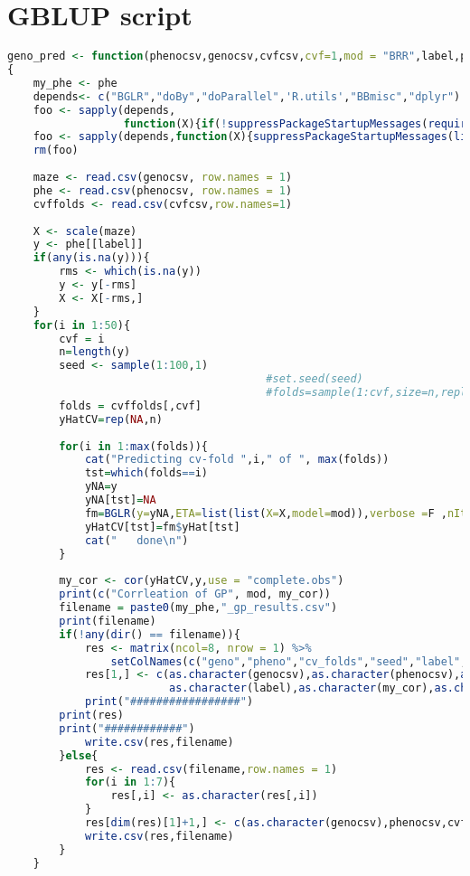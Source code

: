 \section{GBLUP script}
\begin{lstlisting}[language=R]
    geno_pred <- function(phenocsv,genocsv,cvfcsv,cvf=1,mod = "BRR",label,phe)
{
    my_phe <- phe
    depends<- c("BGLR","doBy","doParallel",'R.utils',"BBmisc","dplyr")
    foo <- sapply(depends,
                  function(X){if(!suppressPackageStartupMessages(require(X,character.only = T))){install.packages(X)}})
    foo <- sapply(depends,function(X){suppressPackageStartupMessages(library(X,character.only=TRUE))})
    rm(foo) 
     
    maze <- read.csv(genocsv, row.names = 1)
    phe <- read.csv(phenocsv, row.names = 1)
    cvffolds <- read.csv(cvfcsv,row.names=1)
    
    X <- scale(maze)
    y <- phe[[label]]
    if(any(is.na(y))){
        rms <- which(is.na(y))
        y <- y[-rms]
        X <- X[-rms,]
    }
    for(i in 1:50){
        cvf = i
        n=length(y)
        seed <- sample(1:100,1)
                                        #set.seed(seed)
                                        #folds=sample(1:cvf,size=n,replace=T)
        folds = cvffolds[,cvf]
        yHatCV=rep(NA,n)
        
        for(i in 1:max(folds)){
            cat("Predicting cv-fold ",i," of ", max(folds))
            tst=which(folds==i)
            yNA=y
            yNA[tst]=NA
            fm=BGLR(y=yNA,ETA=list(list(X=X,model=mod)),verbose =F ,nIter=7000,burnIn=1000)
            yHatCV[tst]=fm$yHat[tst]
            cat("   done\n")
        }
        
        my_cor <- cor(yHatCV,y,use = "complete.obs")
        print(c("Corrleation of GP", mod, my_cor))
        filename = paste0(my_phe,"_gp_results.csv")
        print(filename)
        if(!any(dir() == filename)){
            res <- matrix(ncol=8, nrow = 1) %>%
                setColNames(c("geno","pheno","cv_folds","seed","label", "cor","method","nmark"))
            res[1,] <- c(as.character(genocsv),as.character(phenocsv),as.character(cvf),as.character(seed),
                         as.character(label),as.character(my_cor),as.character(mod),dim(X)[2])
            print("#################")
	    print(res)
	    print("############")
            write.csv(res,filename)
        }else{
            res <- read.csv(filename,row.names = 1)
            for(i in 1:7){
                res[,i] <- as.character(res[,i])
            }
            res[dim(res)[1]+1,] <- c(as.character(genocsv),phenocsv,cvf,seed,as.character(label),my_cor,mod,dim(X)[2])
            write.csv(res,filename)
        }
    }
    

\end{lstlisting}
